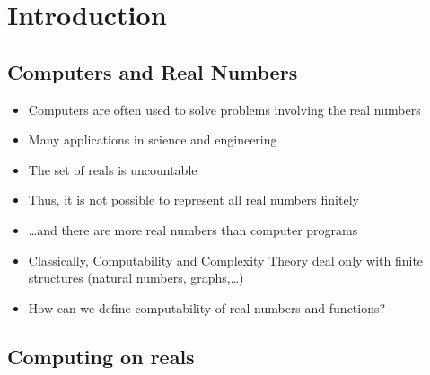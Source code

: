 \section{Introduction}
\subsection{Computers and Real Numbers}

\begin{frame}
  \begin{itemize}
      \item Computers are often used to solve problems involving the real numbers
      \item Many applications in science and engineering
      \item The set of reals is uncountable
      \item Thus, it is not possible to represent all real numbers finitely
      \item \ldots and there are more real numbers than computer programs
      \item Classically, Computability and Complexity Theory deal only with finite structures (natural numbers, graphs,\ldots)
      \item How can we define computability of real numbers and functions?
  \end{itemize}
\end{frame}
\subsection{Computing on reals}

